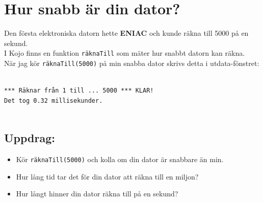 \chapter{Hur snabb är din dator?}Den första elektroniska datorn hette {\bf ENIAC} och kunde räkna till 5000 på en sekund.\\
I Kojo finns en funktion \lstinline{räknaTill} som mäter hur snabbt datorn kan räkna.\\
När jag kör \lstinline{räknaTill(5000)} på min snabba dator skrivs detta i utdata-fönstret:

\begin{lstlisting}[numbers=none]

*** Räknar från 1 till ... 5000 *** KLAR!
Det tog 0.32 millisekunder.
      
\end{lstlisting}
        
\section*{\color{BrickRed}Uppdrag:}


\begin{itemize}

\item {Kör \lstinline{räknaTill(5000)} och kolla om din dator är snabbare än min.}
\item {Hur lång tid tar det för din dator att räkna till en miljon?}
\item {Hur långt hinner din dator räkna till på en sekund?}

\end{itemize}


